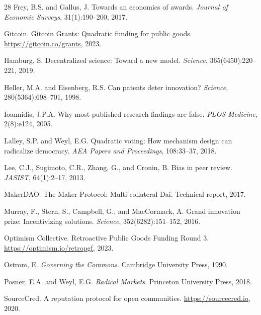 \documentclass[11pt,a4paper]{article}
\begin{document}
\begin{thebibliography}{28}
Frey, B.S. and Gallus, J.
\newblock Towards an economics of awards.
\newblock \emph{Journal of Economic Surveys}, 31(1):190--200, 2017.

Gitcoin.
\newblock Gitcoin Grants: Quadratic funding for public goods.
\newblock \url{https://gitcoin.co/grants}, 2023.

Hamburg, S.
\newblock Decentralized science: Toward a new model.
\newblock \emph{Science}, 365(6450):220--221, 2019.

Heller, M.A. and Eisenberg, R.S.
\newblock Can patents deter innovation?
\newblock \emph{Science}, 280(5364):698--701, 1998.

Ioannidis, J.P.A.
\newblock Why most published research findings are false.
\newblock \emph{PLOS Medicine}, 2(8):e124, 2005.

Lalley, S.P. and Weyl, E.G.
\newblock Quadratic voting: How mechanism design can radicalize democracy.
\newblock \emph{AEA Papers and Proceedings}, 108:33--37, 2018.

Lee, C.J., Sugimoto, C.R., Zhang, G., and Cronin, B.
\newblock Bias in peer review.
\newblock \emph{JASIST}, 64(1):2--17, 2013.

MakerDAO.
\newblock The Maker Protocol: Multi-collateral Dai.
\newblock Technical report, 2017.

Murray, F., Stern, S., Campbell, G., and MacCormack, A.
\newblock Grand innovation prize: Incentivizing solutions.
\newblock \emph{Science}, 352(6282):151--152, 2016.

Optimism Collective.
\newblock Retroactive Public Goods Funding Round 3.
\newblock \url{https://optimism.io/retropgf}, 2023.

Ostrom, E.
\newblock \emph{Governing the Commons}.
\newblock Cambridge University Press, 1990.

Posner, E.A. and Weyl, E.G.
\newblock \emph{Radical Markets}.
\newblock Princeton University Press, 2018.

SourceCred.
\newblock A reputation protocol for open communities.
\newblock \url{https://sourcecred.io}, 2020.


\end{thebibliography}
\end{document}
